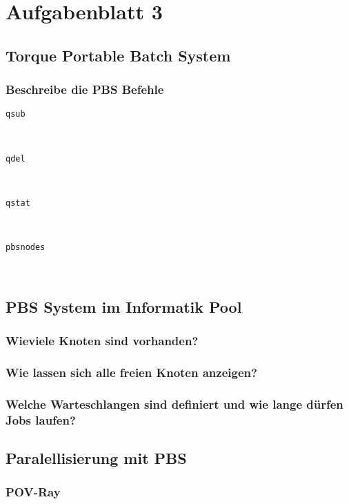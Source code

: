 \section{Aufgabenblatt 3}

\subsection{Torque Portable Batch System}
\subsubsection{Beschreibe die PBS Befehle}

\begin{description}
	\item[\texttt{qsub}] \hfill \\
	\item[\texttt{qdel}] \hfill \\
	\item[\texttt{qstat}] \hfill \\
	\item[\texttt{pbsnodes}] \hfill \\
\end{description}


\subsection{PBS System im Informatik Pool}
\subsubsection{Wieviele Knoten sind vorhanden?}
\subsubsection{Wie lassen sich alle freien Knoten anzeigen?}
\subsubsection{Welche Warteschlangen sind definiert und wie lange dürfen Jobs laufen?}


\subsection{Paralellisierung mit PBS}

\subsubsection{POV-Ray}
